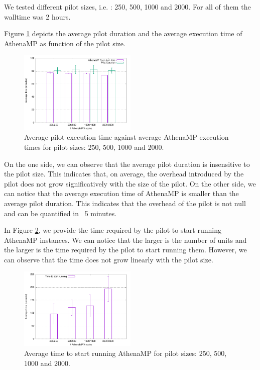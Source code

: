 We tested different pilot sizes, i.e. : 250, 500, 1000 and 2000. For all of them the walltime was 2 hours.

Figure \ref{fig:weakScal1a} depicts the average pilot duration and the average execution time of AthenaMP as function of the pilot size.  

\begin{figure}[!htb]
        \includegraphics[width=0.5\textwidth]{./figures/NGE/weakET1.pdf}
    \caption{Average pilot execution time against average AthenaMP execution times for pilot sizes: 250, 500, 1000 and 2000.}
\label{fig:weakScal1a}
\end{figure}

On the one side, we can observe that the average pilot duration is insensitive to the pilot size. This indicates that, on average, the overhead introduced by the pilot does not grow significatively with the size of the pilot.
On the other side, we can notice that the average execution time of AthenaMP is smaller than the average pilot duration. This indicates that the overhead of the pilot is not null and can be quantified in ~5 minutes.  


In Figure \ref{fig:weakScal1b}, we provide the time required by the pilot to start running AthenaMP instances.  
We can notice that the larger is the number of units and the larger is the time required by the pilot to start running them. However, we can observe that the time does not grow linearly with the pilot size. 

\begin{figure}[!htb]
        \includegraphics[width=0.5\textwidth]{./figures/NGE/weakStart1.pdf}
    \caption{Average time to start running AthenaMP for pilot sizes: 250, 500, 1000 and 2000.}
\label{fig:weakScal1b}
\end{figure}


